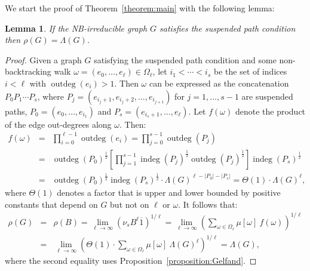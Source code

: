 \documentclass{article}
\newtheorem{lemma}[theorem]{Lemma}
\DeclareMathOperator{\outdeg}{outdeg}
\DeclareMathOperator{\indeg}{indeg}
\begin{document}
We start the proof of Theorem~\ref{theorem:main} with the following lemma:

\begin{lemma}\label{lemma:suspended_implies_rho_eq_Lambda}
    If the NB-irreducible graph $G$ satisfies the suspended path condition then $\rho(G) = \Lambda(G)$.
\end{lemma}

\begin{proof}
    Given a graph $G$ satisfying the suspended path condition and some non-backtracking walk $\omega = (e_0,\ldots,e_\ell)\in \Omega_\ell$, 
    let $i_1 < \cdots < i_s$ be the set of indices $i<\ell$ with $\outdeg(e_i) > 1$.
    Then $\omega$ can be expressed as the concatenation $P_0 P_1 \cdots P_s$, where $P_j = (e_{i_j+1},e_{i_j+2},\ldots,e_{i_{j+1}})$ for $j=1,\ldots,s-1$ are suspended paths, 
    $P_0 = (e_0,\ldots,e_{i_1})$ and $P_s = (e_{i_s+1},\ldots,e_\ell)$.
    Let $f(\omega)$ denote the product of the edge out-degrees along $\omega$.
    Then:
    \begin{eqnarray}
        f(\omega) 
        &=& \prod_{i=0}^{\ell-1} \outdeg(e_i) 
         =  \prod_{j=0}^{s-1} \outdeg(P_j)                                \nonumber \\
        &=& \outdeg(P_0)^\frac{1}{2} \left[ \prod_{j=1}^{s-1} \indeg(P_j)^\frac{1}{2} \outdeg(P_j)^\frac{1}{2} \right] \indeg(P_s)^\frac{1}{2}                               \nonumber \\
        &=& \outdeg(P_0)^\frac{1}{2} \indeg(P_s)^\frac{1}{2} \cdot \Lambda(G)^{\ell-|P_0|-|P_s|}
        = \Theta(1) \cdot \Lambda(G)^{\ell},                              \label{eq:outdegree_prod_approx}
    \end{eqnarray}
    where $\Theta(1)$ denotes a factor that is upper and lower bounded by positive constants that depend on $G$ but not on $\ell$ or $\omega$.
    It follows that:
    \begin{eqnarray*}
         \rho(G) 
         &=& \rho(B)  
         = \lim_{\ell \rightarrow \infty} \left( \nu_s B^\ell \overline{1} \right)^{1/\ell} 
         = \lim_{\ell \rightarrow \infty} \left(  \sum_{\omega \in \Omega_\ell} \mu[\omega] \ f(\omega) \right)^{1/\ell} \\
         &=& \lim_{\ell \rightarrow \infty} \left(   \Theta(1) \cdot \sum_{\omega \in \Omega_\ell} \mu[\omega] \ \Lambda(G)^\ell \right)^{1/\ell} 
         = \Lambda(G),
    \end{eqnarray*}
    where the second equality uses Proposition~\ref{proposition:Gelfand}.
\end{proof}
\end{document}
